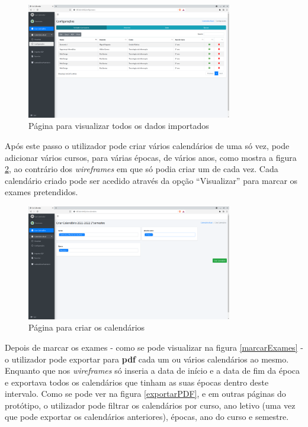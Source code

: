 \documentclass[11pt, twoside]{report}
\begin{document}
	
	\begin{figure}[H] 
		\centering 							\includegraphics[width=0.8\textwidth,height=0.8\textheight,keepaspectratio]{image/PrototipoAFNF/Configuracoes}
		\caption{Página para visualizar todos os dados importados}
		\label{configuracoes}
	\end{figure}
	
	Após este passo o utilizador pode criar vários calendários de uma só vez, pode adicionar vários cursos, para várias épocas, de vários anos, como mostra a figura \ref{criarCalendario}, ao contrário dos \textit{wireframes} em que só podia criar um de cada vez. Cada calendário criado pode ser acedido através da opção ``Visualizar'' para marcar os exames pretendidos. 
	
	
	 \begin{figure}[H] 
	 	\centering 							\includegraphics[width=0.8\textwidth,height=0.8\textheight,keepaspectratio]{image/PrototipoAFNF/criarCalendario}
	 	\caption{Página para criar os calendários}
	 	\label{criarCalendario}
	 \end{figure}
 
 	Depois de marcar os exames - como se pode visualizar na figura \ref{marcarExames} - o utilizador pode exportar para \textbf{pdf} cada um ou vários calendários ao mesmo.
 	Enquanto que nos \textit{wireframes} só inseria a data de início e a data de fim da época e exportava todos os calendários que tinham as suas épocas dentro deste intervalo.
 	Como se pode ver na figura \ref{exportarPDF}, e em outras páginas do protótipo, o utilizador pode filtrar os calendários por curso, ano letivo (uma vez que pode exportar os calendários anteriores), épocas, ano do curso e semestre. 
 	
\end{document}
